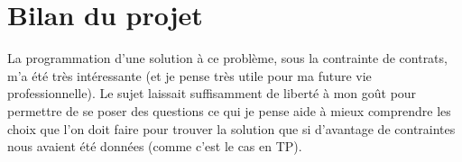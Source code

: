 \documentclass{report}
\begin{document}
	\section{Bilan du projet}
	La programmation d'une solution à ce problème, sous la contrainte de contrats, m'a été très intéressante (et je pense très utile pour ma future vie professionnelle). Le sujet laissait suffisamment de liberté à mon go\^ut pour permettre de se poser des questions ce qui je pense aide à mieux comprendre les choix que l'on doit faire pour trouver la solution que si d'avantage de contraintes nous avaient été données (comme c'est le cas en TP).
	
\end{document}
